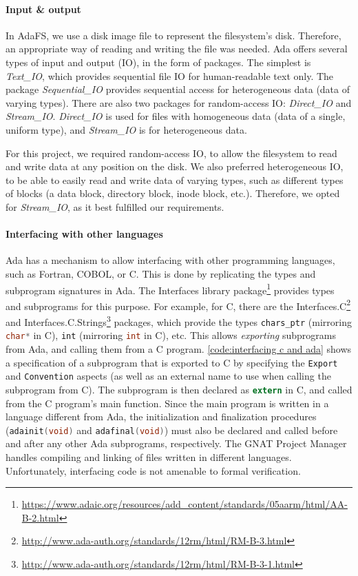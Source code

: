 \paragraph{Input \& output}
In AdaFS, we use a disk image file to represent the filesystem's disk.
Therefore, an appropriate way of reading and writing the file was needed.
Ada offers several types of input and output (IO), in the form of packages.
The simplest is \textit{Text\_IO}, which provides sequential file IO for human-readable text only.
The package \textit{Sequential\_IO} provides sequential access for heterogeneous data (data of varying types).
There are also two packages for random-access IO: \textit{Direct\_IO} and \textit{Stream\_IO}.
\textit{Direct\_IO} is used for files with homogeneous data (data of a single, uniform type), and \textit{Stream\_IO} is for heterogeneous data.

For this project, we required random-access IO, to allow the filesystem to read and write data at any position on the disk.
We also preferred heterogeneous IO, to be able to easily read and write data of varying types, such as different types of blocks (a data block, directory block, inode block, etc.).
Therefore, we opted for \textit{Stream\_IO}, as it best fulfilled our requirements.

\paragraph{Interfacing with other languages}
Ada has a mechanism to allow interfacing with other programming languages, such as Fortran, COBOL, or C.
This is done by replicating the types and subprogram signatures in Ada.
The Interfaces library package\footnote{\url{https://www.adaic.org/resources/add_content/standards/05aarm/html/AA-B-2.html}} provides types and subprograms for this purpose.
For example, for C, there are the Interfaces.C\footnote{\url{http://www.ada-auth.org/standards/12rm/html/RM-B-3.html}} and Interfaces.C.Strings\footnote{\url{http://www.ada-auth.org/standards/12rm/html/RM-B-3-1.html}} packages, which provide the types \lstinline[language=Ada]{chars_ptr} (mirroring \lstinline[language=C]{char*} in C), \lstinline[language=Ada]{int} (mirroring \lstinline[language=C]{int} in C), etc.
This allows \textit{exporting} subprograms from Ada, and calling them from a C program.
\autoref{code:interfacing c and ada} shows a specification of a subprogram that is exported to C by specifying the \lstinline[language=Ada]{Export} and \lstinline[language=Ada]{Convention} aspects (as well as an external name to use when calling the subprogram from C).
The subprogram is then declared as \lstinline[language=C]{extern} in C, and called from the C program's main function.
Since the main program is written in a language different from Ada, the initialization and finalization procedures (\lstinline[language=C]{adainit(void)} and \lstinline[language=C]{adafinal(void)}) must also be declared and called before and after any other Ada subprograms, respectively.
The GNAT Project Manager handles compiling and linking of files written in different languages.
Unfortunately, interfacing code is not amenable to formal verification.

